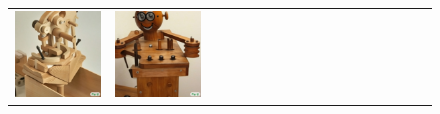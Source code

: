 \begin{figure}[ht!]
\begin{adjustwidth}{-0.8in}{-0.5in}
\begin{tabular}{cccccccccccccccccccc}
\multicolumn{2}{c}{\includegraphics[width=\threebythreecolwidth\textwidth]{figures/cherries/wood1.jpg}} &
\multicolumn{2}{c}{\includegraphics[width=\threebythreecolwidth\textwidth]{figures/cherries/wood2.jpg}} &

\end{tabular}
\end{adjustwidth}
\end{figure}
